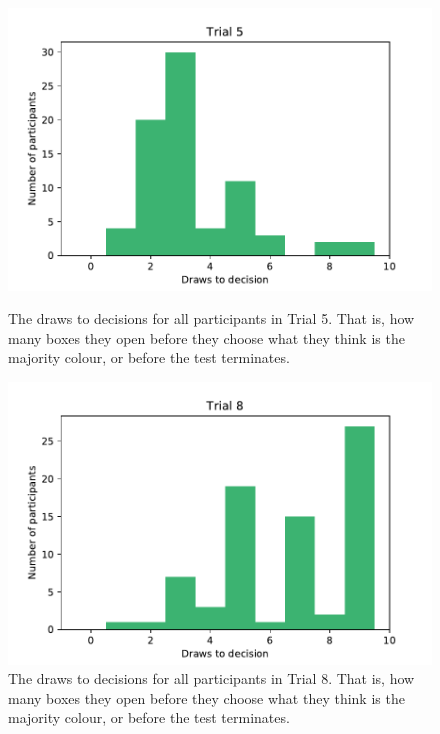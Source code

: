 \begin{figure}
    \centering
    \begin{minipage}{0.45\textwidth}
        \centering
        \includegraphics[scale=0.4]{pictures/dtd5_histogram.pdf}
        \caption[Draws to Decisions in Trial 5]{The draws to decisions for all participants in Trial 5. That is, how many boxes they open before they choose what they think is the majority colour, or before the test terminates.}
        \label{fig:histogram_trial5}
    \end{minipage}\hfill
    \begin{minipage}{0.45\textwidth}
        \centering
        \includegraphics[scale=0.4]{pictures/dtd8_histogram.pdf}
        \caption[Draws to Decisions in Trial 8]{The draws to decisions for all participants in Trial 8. That is, how many boxes they open before they choose what they think is the majority colour, or before the test terminates.}
        \label{fig:histogram_trial8}
    \end{minipage}
\end{figure}

